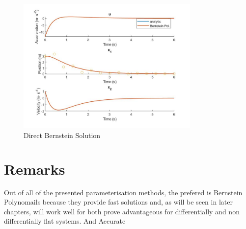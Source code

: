 \begin{figure}[h!]
\centering
\includegraphics[width=0.8\textwidth]{Images/bernstein_1d.jpg}
\caption{Direct Bernstein Solution}
\label{fig:bernstein_1d}
\end{figure}


\section{Remarks}

\par Out of all of the presented parameterisation methods, the prefered is Bernstein Polynomails because they provide fast solutions and, as will be seen in later chapters, will work well for both prove advantageous for differentially and non differentially flat systems. And Accurate 
\par 


